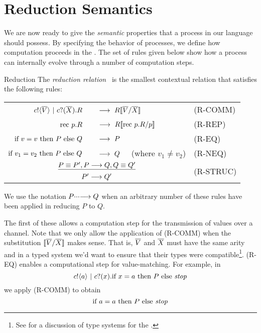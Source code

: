 \section{Reduction Semantics}\label{secreducationsemantics}
We are now ready to give the \emph{semantic} properties that a process in our language should possess.  
By specifying the behavior of processes, we define how computation proceeds in the \picalc.  
The set of rules given below show how a process can internally evolve through a number of computation steps.
\begin{definition}{Reduction}
	The \emph{reduction relation} \pred\ is the smallest contextual relation that satisfies the following rules:
	\begin{center}\begin{tabular}{rll}
		${c}!\langle{ \ensuremath{\overline{V}} }\rangle \ |\  {c}?({\overline{X}}).R$\ &\  $\longrightarrow\  R\llbracket{ \ensuremath{\overline{V}} }/{\overline{X}}\rrbracket$ & \tiny{(R-COMM)}\\
		$\text{rec }{p}.R$\ &\  $\longrightarrow\  R\llbracket{ \ensuremath{\text{rec }{p}.} R}/{p}\rrbracket$ & \tiny{(R-REP)}\\
		$\text{if } {v = v}\text{ then } P \text{ else } Q$\ &\ $\pred\ P$ & \tiny{(R-EQ)}\\
		$\text{if } {v_1 = v_2}\text{ then } P \text{ else } Q$\ &\ $\pred\ Q$ \ \ (where $v_1\neq v_2$)& \tiny{(R-NEQ)}\\
		\multicolumn{2}{c}{\hspace{4.5em}$\underline{P\equiv P', P \longrightarrow Q, Q\equiv Q'}$} & \multirow{2}{*}{\tiny{(R-STRUC)}}\\
		\multicolumn{2}{c}{\hspace{4.5em}$P'\longrightarrow Q'$}
	\end{tabular}\end{center}
	We use the notation $P\cdotp\!\cdotp\!\cdotp\!\longrightarrow Q$ when an arbitrary number of these rules have been applied in reducing $P$ to $Q$.
\end{definition}
The first of these allows a computation step for the transmission of values over a channel.  Note that we only allow the application of (R-COMM) when the substitution $\llbracket{ \ensuremath{\overline{V}} }/{\overline{X}}\rrbracket$ makes sense.  
That is, $\overline{V}$ and $\overline{X}$ must have the same arity and in a typed system we'd want to ensure that their types were compatible\footnote{See \cite{henn07} for a discussion of type systems for the \picalc.}.
(R-EQ) enables a computational step for value-matching.  
For example, in
\[
	{c}!\langle{a}\rangle \ |\  {c}?({x}). \text{if } {x=a} \text{ then } P \text{ else } \mbox{\emph{stop}}  
\]
we apply (R-COMM) to obtain
\[
	\text{if } {a=a} \text{ then } P \text{ else } \mbox{\emph{stop}}  
\]
